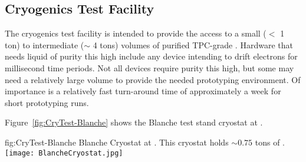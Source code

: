 \subsection{Cryogenics Test Facility}
\label{sec:fdgen-slow-cryo-test-facil}
The cryogenics test facility is intended to provide the access to a small ($<$ \num{1} ton) to intermediate ($\sim$ \num{4} tons) volumes of purified TPC-grade \lar{}. Hardware that needs liquid of purity this high include any device intending to drift electrons for millisecond time periods. Not all devices require purity this high, but some may need a relatively large volume to provide the needed prototyping environment. Of importance is a relatively fast turn-around time of approximately a week for short prototyping runs.

Figure~\ref{fig:CryTest-Blanche} shows the Blanche test stand cryostat at \fnal.

\begin{dunefigure}{fig:CryTest-Blanche} 
  {Blanche Cryostat at \fnal. This cryostat holds $\sim 0.75$ tons of \lar{}.}
  \texttt{[image: BlancheCryostat.jpg]}%
\end{dunefigure}
